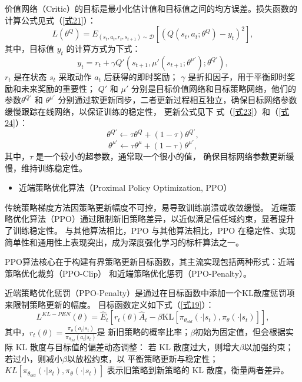 价值网络（Critic）的目标是最小化估计值和目标值之间的均方误差。损失函数的计算公式见式（\ref{式21}）：
\begin{equation}\label{式21}
    L(\theta^{Q}) = E_{(s_t, a_t, r_t, s_{t + 1}) \sim \mathcal{D}}\left[\left(Q(s_t, a_t;\theta^{Q}) - y_t\right)^2\right],
\end{equation}
其中，目标值 $y_t$ 的计算方式为下式：
\begin{equation}\label{式22}
    y_t = r_t + \gamma Q'(s_{t + 1}, \mu'(s_{t + 1};\theta^{\mu'});\theta^{Q'}),
\end{equation}
$r_t$ 是在状态 $s_t$ 采取动作 $a_t$ 后获得的即时奖励；
$\gamma$ 是折扣因子，用于平衡即时奖励和未来奖励的重要性；
$Q'$ 和 $\mu'$ 分别是目标价值网络和目标策略网络，他们的参数$\theta^{Q'}$ 和 $\theta^{\mu'}$
分别通过软更新同步，二者更新过程相互独立，确保目标网络参数缓慢跟踪在线网络，以保证训练的稳定性，
更新公式见下
式（\ref{式23}）和（\ref{式24}）：
\begin{equation}\label{式23}
    \theta^{Q'} \leftarrow \tau \theta^{Q} + (1 - \tau) \theta^{Q'}, 
\end{equation}
\begin{equation}\label{式24}
    \theta^{\mu'} \leftarrow \tau \theta^{\mu} + (1 - \tau) \theta^{\mu'},
\end{equation}
其中，$\tau$ 是一个较小的超参数，通常取一个很小的值，
确保目标网络参数更新缓慢，维持训练稳定性。


\begin{itemize}
    \item 近端策略优化算法（Proximal Policy Optimization, PPO）
\end{itemize}

传统策略梯度方法因策略更新幅度不可控，易导致训练崩溃或收敛缓慢。
近端策略优化算法（PPO）通过限制新旧策略差异，以近似满足信任域约束，显著提升了训练稳定性。
与其他算法相比，PPO 与其他算法相比，PPO 在稳定性、实现简单性和通用性上表现突出，成为深度强化学习的标杆算法之一。

PPO算法核心在于构建有界策略更新目标函数，其主流实现包括两种形式：近端策略优化裁剪（PPO-Clip）
和近端策略优化惩罚（PPO-Penalty）。

近端策略优化惩罚（PPO-Penalty）是通过在目标函数中添加一个KL散度惩罚项来限制策略更新的幅度。
目标函数定义如下式（\ref{式19}）：
\begin{equation}\label{式19}
    L^{KL - PEN}(\theta) = \hat{E}_t\left[r_t(\theta) \hat{A}_t - \beta \text{KL}\left[\pi_{\theta_{old}}(\cdot|s_t), \pi_{\theta}(\cdot|s_t)\right]\right],
\end{equation}
其中，$r_t(\theta)=\frac{\pi_{\theta}(a_t|s_t)}{\pi_{\theta_{old}}(a_t|s_t)}$是
新旧策略的概率比率；$ \beta $初始为固定值，但会根据实际 KL 散度与目标值的偏差动态调整：
若 KL 散度过大，则增大$\beta $以加强约束；若过小，则减小$\beta $以放松约束，以
平衡策略更新与稳定性；
$KL \left[\pi_{\theta_{old}}(\cdot|s_t), \pi_{\theta}(\cdot|s_t)\right]$
表示旧策略到新策略的 KL 散度，衡量两者差异。


